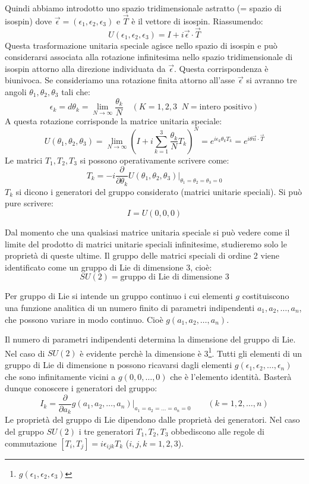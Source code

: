 Quindi abbiamo introdotto uno spazio tridimensionale astratto (= spazio di
isospin) dove $\vec{\epsilon}=(\epsilon_1,\epsilon_2,\epsilon_3)$ e $\vec{T}$ è
il vettore di isospin. Riassumendo:
\begin{equation}
U(\epsilon_1,\epsilon_2,\epsilon_3)=I+i\vec{\epsilon}\cdot\vec{T}
\end{equation}
Questa trasformazione unitaria speciale agisce nello spazio di isospin e può
considerarsi associata alla rotazione infinitesima nello spazio tridimensionale
di isospin attorno alla direzione individuata da $\vec{\epsilon}$.
Questa corrispondenza è biunivoca. Se consideriamo una rotazione finita attorno
all'asse $\vec{\epsilon}$ si avranno tre angoli $\theta_1,\theta_2,\theta_3$
tali che:
\[
\epsilon_k=d\theta_k=\lim_{N\to\infty}\frac{\theta_k}{N}\quad(K=1,2,3\;\;N=\text{intero positivo})
\]
A questa rotazione corrisponde la matrice unitaria speciale:
\begin{equation}
U(\theta_1,\theta_2,\theta_3)=\lim_{N\to\infty}(I+i\sum_{k=1}^3\frac{\theta_k}{N}T_k)^N=e^{i\epsilon_k\theta_kT_k}=e^{i\theta\vec{n}\cdot\vec{T}}
\end{equation}
Le matrici $T_1,T_2,T_3$ si possono operativamente scrivere come:
\begin{equation}
T_k=-i\frac{\partial}{\partial\theta_k}U(\theta_1,\theta_2,\theta_3)\bigr\vert_{\theta_1=\theta_2=\theta_3=0}
\end{equation}
$T_k$ si dicono i generatori del gruppo considerato (matrici unitarie speciali).
Si può pure scrivere:
\[
I=U(0,0,0)
\]

Dal momento che una qualsiasi matrice unitaria speciale si può vedere come il
limite del prodotto di matrici unitarie speciali infinitesime, studieremo solo
le proprietà di queste ultime.
Il gruppo delle matrici speciali di ordine 2 viene identificato come un gruppo
di Lie di dimensione 3, cioè:
\begin{equation}
SU(2)=\text{gruppo di Lie di dimensione }3
\end{equation}

Per gruppo di Lie si intende un gruppo continuo i cui elementi $g$ costituiscono
una funzione analitica di un numero finito di parametri indipendenti
$a_1,a_2,\dots,a_n$, che possono variare in modo continuo.
Cioè $g(a_1,a_2,\dots,a_n)$.

Il numero di parametri indipendenti determina la dimensione del gruppo di Lie.
Nel caso di $SU(2)$ è evidente perchè la dimensione è
3\footnote{$g(\epsilon_1,\epsilon_2,\epsilon_3)$}.
Tutti gli elementi di un gruppo di Lie di dimensione n possono ricavarsi dagli
elementi $g(\epsilon_1,\epsilon_2,\dots,\epsilon_n)$ che sono infinitamente
vicini a $g(0,0,\dots,0)$ che è l'elemento identità.
Basterà dunque conoscere i generatori del gruppo:
\begin{equation}
I_k=\frac{\partial}{\partial a_k}g(a_1,a_2,\dots ,a_n)\bigr\vert_{a_1=a_2=\dots =a_n=0}\qquad (k=1, 2, \dots , n)
\end{equation}
Le proprietà del gruppo di Lie dipendono dalle proprietà dei generatori. Nel
caso del gruppo $SU(2)$ i tre generatori $T_1,T_2,T_3$ obbediscono alle regole
di commutazione $[T_i,T_j]=i\epsilon_{ijk}T_k$ ($i,j,k=1,2,3$).

